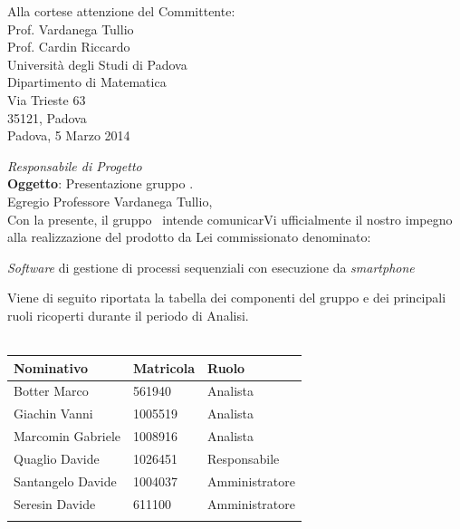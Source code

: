 \documentclass[11pt,a4paper]{article}
\begin{document}
\begin{flushright}
Alla cortese attenzione del Committente:\\
Prof. Vardanega Tullio\\
Prof. Cardin Riccardo\\
Università degli Studi di Padova\\
Dipartimento di Matematica\\
Via Trieste 63\\
35121, Padova\\
\bigskip
Padova, 5 Marzo 2014\\
\end{flushright}
\textit{Responsabile di Progetto} \gruppo\\
\medskip
\textbf{Oggetto}: Presentazione gruppo \gruppo.\\
Egregio Professore Vardanega Tullio,\\
Con la presente, il gruppo \gruppo ~intende comunicarVi ufficialmente il nostro impegno alla realizzazione del prodotto da Lei commissionato denominato:\\
\begin{center}
\textbf{\progetto} \textit{Software} di gestione di processi sequenziali con esecuzione da \textit{smartphone}\\
\end{center}
Viene di seguito riportata la tabella dei componenti del gruppo \gruppo{} e dei principali ruoli ricoperti durante il periodo di Analisi.\\
\\
\begin{tabular}{l l l}
\hline
Nominativo & Matricola & Ruolo\\
\hline
Botter Marco & 561940 & Analista\\ %
\hline
Giachin Vanni & 1005519 & Analista\\ %
\hline
Marcomin Gabriele & 1008916 & Analista\\ %
\hline
Quaglio Davide & 1026451 &  Responsabile\\ %
\hline
Santangelo Davide & 1004037 & Amministratore\\ %
\hline
Seresin Davide & 611100 & Amministratore\\ %
\hline
\\
\end{tabular}\\
\end{document}
